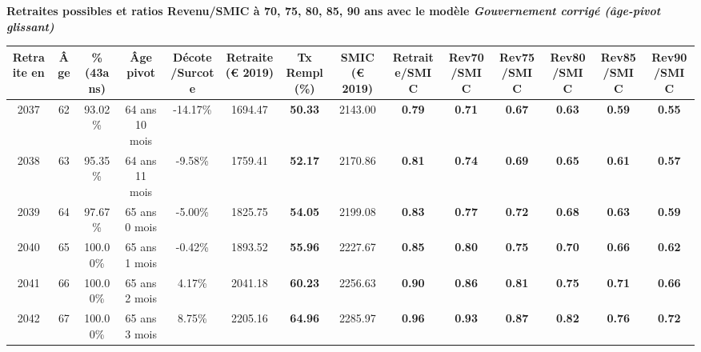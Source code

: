  \vspace{0.1cm} 
{\bf \noindent Retraites possibles et ratios Revenu/SMIC à 70, 75, 80, 85, 90 ans avec le modèle \emph{Gouvernement corrigé (âge-pivot glissant)}}  
 
\begin{adjustbox}{max width=\textwidth} 
\begin{tabular}[htb]{|c|c||c|c|c||c|c||c||c|c|c|c|c|c|} 
\hline 
 Retraite en &  Âge &  \%(43ans) &  Âge pivot &  Décote/Surcote &  Retraite (\euro{} 2019) &  Tx Rempl(\%) &  SMIC (\euro{} 2019) &  Retraite/SMIC &  Rev70/SMIC &  Rev75/SMIC &  Rev80/SMIC &  Rev85/SMIC &  Rev90/SMIC \\ 
\hline \hline 
 2037 &  62 &  93.02\% &  64 ans 10 mois &  -14.17\% &  1694.47 &  {\bf 50.33} &  2143.00 &  {\bf {\color{red} 0.79}} &  {\bf {\color{red} 0.71}} &  {\bf {\color{red} 0.67}} &  {\bf {\color{red} 0.63}} &  {\bf {\color{red} 0.59}} &  {\bf {\color{red} 0.55}} \\ 
\hline 
 2038 &  63 &  95.35\% &  64 ans 11 mois &  -9.58\% &  1759.41 &  {\bf 52.17} &  2170.86 &  {\bf {\color{red} 0.81}} &  {\bf {\color{red} 0.74}} &  {\bf {\color{red} 0.69}} &  {\bf {\color{red} 0.65}} &  {\bf {\color{red} 0.61}} &  {\bf {\color{red} 0.57}} \\ 
\hline 
 2039 &  64 &  97.67\% &  65 ans 0 mois &  -5.00\% &  1825.75 &  {\bf 54.05} &  2199.08 &  {\bf {\color{red} 0.83}} &  {\bf {\color{red} 0.77}} &  {\bf {\color{red} 0.72}} &  {\bf {\color{red} 0.68}} &  {\bf {\color{red} 0.63}} &  {\bf {\color{red} 0.59}} \\ 
\hline 
 2040 &  65 &  100.00\% &  65 ans 1 mois &  -0.42\% &  1893.52 &  {\bf 55.96} &  2227.67 &  {\bf {\color{red} 0.85}} &  {\bf {\color{red} 0.80}} &  {\bf {\color{red} 0.75}} &  {\bf {\color{red} 0.70}} &  {\bf {\color{red} 0.66}} &  {\bf {\color{red} 0.62}} \\ 
\hline 
 2041 &  66 &  100.00\% &  65 ans 2 mois &  4.17\% &  2041.18 &  {\bf 60.23} &  2256.63 &  {\bf {\color{red} 0.90}} &  {\bf {\color{red} 0.86}} &  {\bf {\color{red} 0.81}} &  {\bf {\color{red} 0.75}} &  {\bf {\color{red} 0.71}} &  {\bf {\color{red} 0.66}} \\ 
\hline 
 2042 &  67 &  100.00\% &  65 ans 3 mois &  8.75\% &  2205.16 &  {\bf 64.96} &  2285.97 &  {\bf {\color{red} 0.96}} &  {\bf {\color{red} 0.93}} &  {\bf {\color{red} 0.87}} &  {\bf {\color{red} 0.82}} &  {\bf {\color{red} 0.76}} &  {\bf {\color{red} 0.72}} \\ 
\hline 
\hline 
\end{tabular} 
\end{adjustbox} 
 
